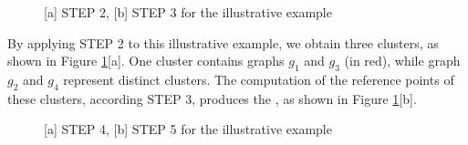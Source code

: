 \begin{figure}[h!]
    \centering
    \qquad
        \caption{[a] STEP 2, [b] STEP 3 for the illustrative example}%
    \label{fig:example3}%
\end{figure}

\noindent
By applying STEP 2 to this illustrative example, we obtain three clusters, as shown in Figure \ref{fig:example3}[a]. One cluster contains graphs $g_1$ and $g_3$ (in red), while graph $g_2$ and $g_4$ represent distinct clusters. The computation of the reference points of these clusters, according  STEP 3, produces the , as shown in Figure  \ref{fig:example3}[b].


\begin{figure}[h!]
    \centering
    \qquad
        \caption{[a] STEP 4, [b] STEP 5 for the illustrative example}%
    \label{fig:example4}%
\end{figure}

